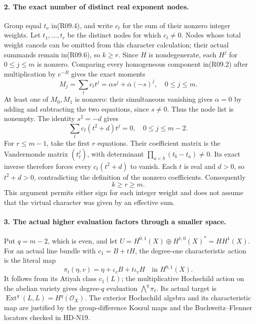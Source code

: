\paragraph{2. The exact number of distinct real exponent nodes.}
Group equal $t_\nu$ in(R09.4), and write $c_t$ for the sum
of their nonzero integer weights. Let $t_1,\ldots,t_r$ be
the distinct nodes for which $c_t\ne0$. Nodes whose total
weight cancels can be omitted from this character calculation;
their actual summands remain in(R09.6), so $k\ge r$.
Since $H$ is nondegenerate, each $H^j$ for $0\le j\le m$
is nonzero. Comparing every homogeneous component in(R09.2)
after multiplication by $e^{-B}$ gives the exact moments
\[
       M_j=\sum_{t}c_t t^j
                =\alpha s^j+\overline\alpha(-s)^j,
                               \quad0\le j\le m.             \tag{R09.7}
\]
At least one of $M_0,M_1$ is nonzero: their simultaneous
vanishing gives $\alpha=0$ by adding and subtracting the two
equations, since $s\ne0$. Thus the node list is nonempty.
The identity $s^2=-d$ gives
\[
              \sum_t c_t(t^2+d)t^j=0,
                              \quad0\le j\le m-2.            \tag{R09.8}
\]
For $r\le m-1$, take the first $r$ equations. Their coefficient
matrix is the Vandermonde matrix $(t_\ell^j)$, with determinant
$\prod_{a<b}(t_b-t_a)\ne0$. Its exact inverse therefore
forces every $c_t(t^2+d)$ to vanish. Each $t$ is real and
$d>0$, so $t^2+d>0$, contradicting the definition of the
nonzero coefficients. Consequently
\[
                               k\ge r\ge m.                 \tag{R09.9}
\]
This argument permits either sign for each integer weight and
does not assume that the virtual character was given by an
effective sum.

\paragraph{3. The actual higher evaluation factors through a smaller space.}
Put $q=m-2$, which is even, and let
$U=H^{0,1}(X)\oplus H^{1,0}(X)^*=HH^1(X)$.
For an actual line bundle with $c_1=B+tH$, the degree-one
characteristic action is the literal map
\[
          \pi_t(\eta,v)=\eta+\iota_v B+t\iota_vH
                                      \quad\text{in }H^{0,1}(X).
                                                               \tag{R09.10}
\]
It follows from its Atiyah class $c_1(L)$; the multiplicative
Hochschild action on the abelian variety gives degree-$q$
evaluation $\bigwedge^q\pi_t$. Its actual target is
$\operatorname{Ext}^q(L,L)=H^q(\mathcal O_X)$.
The exterior Hochschild algebra and its characteristic map
are justified by the group-difference Koszul maps and the
Buchweitz--Flenner locators checked in HD-N19.

